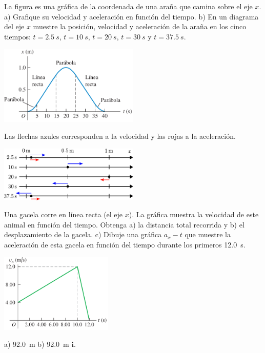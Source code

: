 \documentclass[11pt]{article}
\begin{document}
\begin{exercise}
\begin{multicols}{2}
La figura es una gráfica de la coordenada de una araña que camina sobre el eje $x$. a) Grafique su velocidad y aceleración en función del tiempo. b) En un diagrama del eje $x$ muestre la posición, velocidad y aceleración de la araña en los cinco tiempos: $t = \qty{2.5}{s}$, $t = \qty{10}{s}$, $t = \qty{20}{s}$, $t = \qty{30}{s}$ y $t = \qty{37.5}{s}$.
\begin{center}
    \includegraphics[width=0.5\textwidth]{figs/activ-04.png}
\end{center}
\end{multicols}
\end{exercise}
\begin{solution}
    Las flechas azules corresponden a la velocidad y las rojas a la aceleración.
\begin{center}
    \includegraphics[width=0.5\textwidth]{figs/ac-09.pdf}
\end{center}
\end{solution}

\begin{exercise}
\begin{multicols}{2}
    Una gacela corre en línea recta (el eje $x$). La gráfica muestra la velocidad de este animal en función del tiempo. Obtenga a) la distancia total recorrida y b) el desplazamiento de la gacela. c) Dibuje una gráfica $a_x - t$ que muestre la aceleración de esta gacela en función del tiempo durante los primeros \qty{12.0}{s}.
\begin{center}
    \includegraphics[width=0.4\textwidth]{figs/activ-05.png}
\end{center}
\end{multicols}
\end{exercise}
\begin{solution}
    a) \qty{92.0}{m} b) \qty{92.0}{m} $\bm{i}$.
\end{solution}
\end{document}
